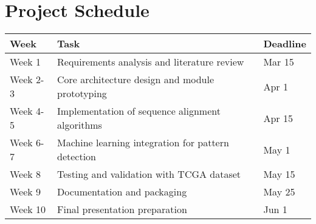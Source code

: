 \documentclass[12pt]{article}
\begin{document}
\section*{Project Schedule}
\begin{tabular}{|p{2cm}|p{10cm}|p{2cm}|}
\hline
\textbf{Week} & \textbf{Task} & \textbf{Deadline} \\
\hline
Week 1 & Requirements analysis and literature review & Mar 15 \\
\hline
Week 2-3 & Core architecture design and module prototyping & Apr 1 \\
\hline
Week 4-5 & Implementation of sequence alignment algorithms & Apr 15 \\
\hline
Week 6-7 & Machine learning integration for pattern detection & May 1 \\
\hline
Week 8 & Testing and validation with TCGA dataset & May 15 \\
\hline
Week 9 & Documentation and packaging & May 25 \\
\hline
Week 10 & Final presentation preparation & Jun 1 \\
\hline
\end{tabular}
\end{document}

